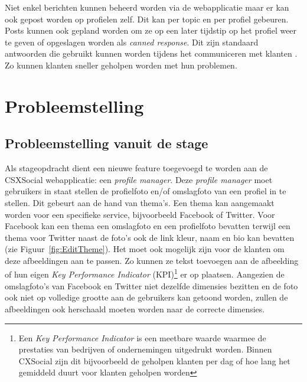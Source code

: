 Niet enkel berichten kunnen beheerd worden via de webapplicatie maar er kan ook gepost worden op profielen zelf. Dit kan per topic en per profiel gebeuren. Posts kunnen ook gepland worden om ze op een later tijdstip op het profiel weer te geven  of opgeslagen worden als \textit{canned response}. Dit zijn standaard antwoorden die gebruikt kunnen worden tijdens het communiceren met klanten \cite{EngagorApp}. Zo kunnen klanten sneller geholpen worden met hun problemen.
 
\chapter{Probleemstelling}
\vspace{-3cm}
\section{Probleemstelling vanuit de stage} \label{BeschrijvingStageOpdracht}

Als stageopdracht dient een nieuwe feature toegevoegd te worden aan de CSXSocial webapplicatie: een \textit{profile manager}. Deze \textit{profile manager} moet gebruikers in staat stellen de profielfoto en/of omslagfoto van een profiel in te stellen. Dit gebeurt aan de hand van thema's. Een thema kan aangemaakt worden voor een specifieke service, bijvoorbeeld Facebook of Twitter. Voor Facebook kan een thema een omslagfoto en een profielfoto bevatten terwijl een thema voor Twitter naast de foto's ook de link kleur, naam en bio kan bevatten (zie Figuur~\ref{fig:EditTheme}). Het moet ook mogelijk zijn voor de klanten om deze afbeeldingen aan te passen. Zo kunnen ze tekst toevoegen aan de afbeelding of hun eigen \textit{Key Performance Indicator} (KPI)\footnote{Een \textit{Key Performance Indicator} is een meetbare waarde waarmee de prestaties van bedrijven of ondernemingen uitgedrukt worden. Binnen CXSocial zijn dit bijvoorbeeld de geholpen klanten per dag of hoe lang het gemiddeld duurt voor klanten geholpen worden} er op plaatsen. Aangezien de omslagfoto's van Facebook en Twitter niet dezelfde dimensies bezitten en de foto ook niet op volledige grootte aan de gebruikers kan getoond worden, zullen de afbeeldingen ook herschaald moeten worden naar de correcte dimensies.

